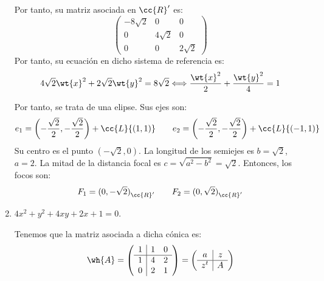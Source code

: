 \begin{ejercicio}
\begin{enumerate}
        
        Por tanto, su matriz asociada en $\cc{R}'$ es:
        \begin{equation*}
            \left(\begin{array}{c|cc}
                -8\sqrt{2} & 0 & 0  \\ \hline
                0 & 4\sqrt{2} & 0 \\
                0 & 0 & 2\sqrt{2}
            \end{array}\right)
        \end{equation*}
        Por tanto, su ecuación en dicho sistema de referencia es:
        \begin{equation*}
            4\sqrt{2}\wt{x}^2 +2\sqrt{2}\wt{y}^2 = 8\sqrt{2} \Longleftrightarrow \frac{\wt{x}^2}{2} +\frac{\wt{y}^2}{4}=1
        \end{equation*}

        Por tanto, se trata de una elipse. Sus ejes son:
        \begin{equation*}
            e_1 = \left(-\frac{\sqrt{2}}{2},-\frac{\sqrt{2}}{2}\right) + \cc{L}\{(1,1)\}
            \qquad
            e_2 = \left(-\frac{\sqrt{2}}{2},-\frac{\sqrt{2}}{2}\right) + \cc{L}\{(-1,1)\}
        \end{equation*}
        Su centro es el punto $\left(-\sqrt{2},0\right)$. La longitud de los semiejes es $b=\sqrt{2}$, $a=2$. La mitad de la distancia focal es $c=\sqrt{a^2-b^2}=\sqrt{2}$. Entonces, los focos son:
        \begin{equation*}
            F_1={(0,-\sqrt{2})}_{\cc{R}'}
            \qquad
            F_2={(0,\sqrt{2})}_{\cc{R}'}
        \end{equation*}

        \item $4x^2+y^2+4xy+2x+1=0$.
    
        Tenemos que la matriz asociada a dicha cónica es:
        \begin{equation*}
            \wh{A} = \left(\begin{array}{c|cc}
                1 & 1 & 0  \\ \hline
                1 & 4 & 2 \\
                0 &  2 & 1
            \end{array}\right)
            = \left(\begin{array}{c|c}
                a & z \\ \hline
                z^t & A
            \end{array}\right)
        \end{equation*}
        

\end{enumerate}
\end{ejercicio}
